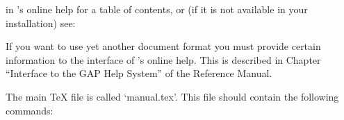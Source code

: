 in {\GAP}'s online help for a  table  of  contents,  or  (if  it  is  not
available in your installation) see:

If you want to use yet another document format you must  provide  certain
information to the interface of {\GAP}'s online help. This  is  described
in Chapter ``Interface to the GAP Help System'' of the
{\GAP} Reference Manual.


\indextt{\\BeginningOfBook}\indextt{\\UseReferences}
\indextt{\\UseGapDocReferences}
\indextt{\\TitlePage}\indextt{\\Colophon}\indextt{\\TableOfContents}
\indextt{\\OneColumnTableOfContents}
\indextt{\\FrontMatter}\indextt{\\Chapters}\indextt{\\Appendices}
\indextt{\\Bibliography}\indextt{\\Index}\indextt{\\EndOfBook}
\indextt{\\Package}\indextt{\\package}
The main {\TeX} file is called `manual.tex'.
This file should contain the following commands:

